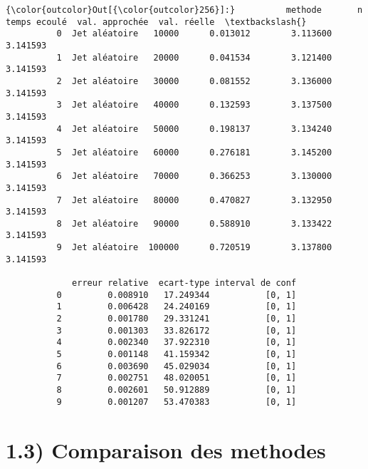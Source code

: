 \documentclass[11pt]{article}
\begin{document}
            \begin{Verbatim}[commandchars=\\\{\}]
{\color{outcolor}Out[{\color{outcolor}256}]:}          methode       n  temps ecoulé  val. approchée  val. réelle  \textbackslash{}
          0  Jet aléatoire   10000      0.013012        3.113600     3.141593   
          1  Jet aléatoire   20000      0.041534        3.121400     3.141593   
          2  Jet aléatoire   30000      0.081552        3.136000     3.141593   
          3  Jet aléatoire   40000      0.132593        3.137500     3.141593   
          4  Jet aléatoire   50000      0.198137        3.134240     3.141593   
          5  Jet aléatoire   60000      0.276181        3.145200     3.141593   
          6  Jet aléatoire   70000      0.366253        3.130000     3.141593   
          7  Jet aléatoire   80000      0.470827        3.132950     3.141593   
          8  Jet aléatoire   90000      0.588910        3.133422     3.141593   
          9  Jet aléatoire  100000      0.720519        3.137800     3.141593   
          
             erreur relative  ecart-type interval de conf  
          0         0.008910   17.249344           [0, 1]  
          1         0.006428   24.240169           [0, 1]  
          2         0.001780   29.331241           [0, 1]  
          3         0.001303   33.826172           [0, 1]  
          4         0.002340   37.922310           [0, 1]  
          5         0.001148   41.159342           [0, 1]  
          6         0.003690   45.029034           [0, 1]  
          7         0.002751   48.020051           [0, 1]  
          8         0.002601   50.912889           [0, 1]  
          9         0.001207   53.470383           [0, 1]  
\end{Verbatim}
        
    \section{1.3) Comparaison des methodes}\label{comparaison-des-methodes}
\end{document}
